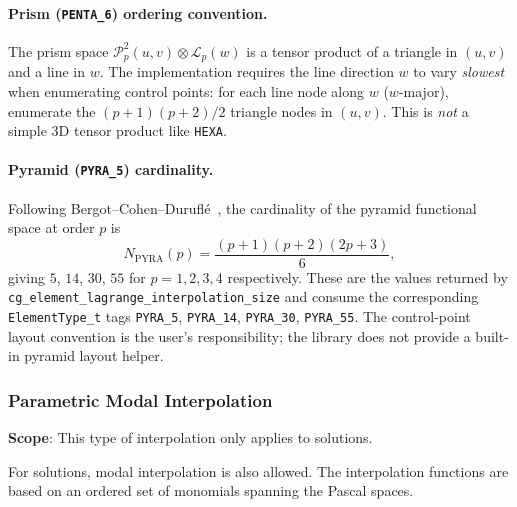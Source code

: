 \documentclass[11pt,letterpaper]{article}
\newenvironment{v2quote}
  {\begin{v2quoteframe}%
   \noindent{\footnotesize\sffamily\bfseries\color{cgnsblue}v2 text}%
   \nopagebreak\par\nopagebreak\vspace{0.15em}}
  {\end{v2quoteframe}}
\newcommand{\Lsp}{\mathcal{L}_p}
\newcommand{\Ptp}{\mathcal{P}^{2}_p}
\begin{document}
\paragraph{Prism (\texttt{PENTA\_6}) ordering convention.}
The prism space $\Ptp(u,v)\otimes\Lsp(w)$ is a tensor product of a triangle in $(u,v)$ and a
line in $w$.  The implementation requires the line direction $w$ to vary \emph{slowest} when
enumerating control points:  for each line node along $w$ ($w$-major), enumerate the
$(p+1)(p+2)/2$ triangle nodes in $(u,v)$.  This is \emph{not} a simple 3D tensor product like
\texttt{HEXA}.

\paragraph{Pyramid (\texttt{PYRA\_5}) cardinality.}
Following Bergot--Cohen--Durufl\'e~\cite{BCD10}, the cardinality of the pyramid functional space
at order $p$ is
\begin{equation}
  N_\mathrm{PYRA}(p) = \frac{(p+1)(p+2)(2p+3)}{6},
\end{equation}
giving $5$, $14$, $30$, $55$ for $p=1,2,3,4$ respectively.  These are the values returned by
\texttt{cg\_element\_lagrange\_interpolation\_size} and consume the corresponding
\texttt{ElementType\_t} tags \texttt{PYRA\_5}, \texttt{PYRA\_14}, \texttt{PYRA\_30},
\texttt{PYRA\_55}.  The control-point layout convention is the user's responsibility; the
library does not provide a built-in pyramid layout helper.

\subsubsection{Parametric Modal Interpolation}
\label{sec:parametric-modal}

\begin{v2quote}
\textbf{Scope}: This type of interpolation only applies to solutions.
\end{v2quote}

\begin{v2quote}
For solutions, modal interpolation is also allowed.  The interpolation functions are based on an
ordered set of monomials spanning the Pascal spaces.
\end{v2quote}
\end{document}
